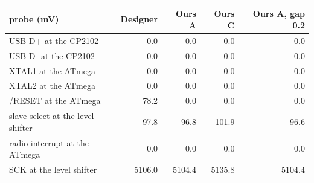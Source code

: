 \begin{tabular}{p{5.6cm}rrrr}
\toprule
probe (mV) & Designer & Ours A & Ours C & Ours A, gap 0.2 \\
\midrule
USB D+ at the CP2102 & 0.0 & 0.0 & 0.0 & 0.0 \\
USB D- at the CP2102 & 0.0 & 0.0 & 0.0 & 0.0 \\
XTAL1 at the ATmega & 0.0 & 0.0 & 0.0 & 0.0 \\
XTAL2 at the ATmega & 0.0 & 0.0 & 0.0 & 0.0 \\
/RESET at the ATmega & 78.2 & 0.0 & 0.0 & 0.0 \\
slave select at the level shifter & 97.8 & 96.8 & 101.9 & 96.6 \\
radio interrupt at the ATmega & 0.0 & 0.0 & 0.0 & 0.0 \\
SCK at the level shifter & 5106.0 & 5104.4 & 5135.8 & 5104.4 \\
\bottomrule
\end{tabular}
